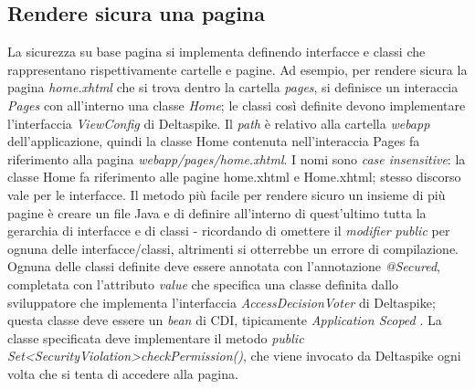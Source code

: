 \subsection{Rendere sicura una pagina} 
La sicurezza su base pagina si implementa definendo interfacce e classi che rappresentano rispettivamente cartelle e pagine. Ad esempio, per rendere sicura la pagina \textsl{home.xhtml} che si trova dentro la cartella \textsl{pages}, si definisce un interaccia \textsl{Pages} con all'interno una classe \textsl{Home}; le classi così definite devono implementare l'interfaccia \textsl{ViewConfig} di Deltaspike. Il \textit{path} è relativo alla cartella \textsl{webapp} dell'applicazione, quindi la classe Home contenuta nell'interaccia Pages fa riferimento alla pagina \textsl{webapp/pages/home.xhtml}. I nomi sono \textit{case insensitive}: la classe Home fa riferimento alle pagine home.xhtml e Home.xhtml; stesso discorso vale per le interfacce.\newline
Il metodo più facile per rendere sicuro un insieme di più pagine è creare un file Java e di definire all'interno di quest'ultimo tutta la gerarchia di interfacce e di classi - ricordando di omettere il \textit{modifier} \textsl{public} per ognuna delle interfacce/classi, altrimenti si otterrebbe un errore di compilazione.\newline
Ognuna delle classi definite deve essere annotata con l'annotazione \textsl{@Secured}, completata con l'attributo \textsl{value} che specifica una classe definita dallo sviluppatore che implementa l'interfaccia \textsl{AccessDecisionVoter} di Deltaspike; questa classe deve essere un \textit{bean} di CDI, tipicamente \textsl{Application Scoped} .
La classe specificata deve implementare il metodo \textsl{public Set\textless SecurityViolation\textgreater \space checkPermission()}, che viene invocato da Deltaspike ogni volta che si tenta di accedere alla pagina.\newline
